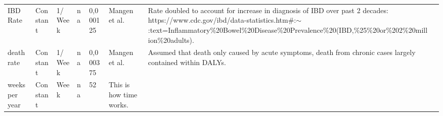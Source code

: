 \begin{landscape}
\begin{longtable}[c]{m{10em}lllm{15em}lll}
IBD Rate                                      & Constant & 1/Week                   & na                        & 0,000125                                                                                                                                                                                                                                                                                 & Mangen et al.                                                                                                                                                                                & Rate doubled to account for increase in diagnosis of IBD over past 2 decades: https://www.cdc.gov/ibd/data-statistics.htm\#:$\sim$:text=Inflammatory\%20Bowel\%20Disease\%20Prevalence\%20(IBD,\%25\%20or\%202\%20million\%20adults). \\
death rate                                    & Constant & 1/Week                   & na                        & 0,000375                                                                                                                                                                                                                                                                                 & Mangen et al.                                                                                                                                                                                & Assumed that death only caused by acute symptoms, death from chronic cases largely contained within DALYs.                                                                                                                            \\
weeks per year                                & Constant & Week                     & na                        & 52                                                                                                                                                                                                                                                                                       & This is how time works.                                                                                                                                                                      &                                                                                                                                                                                                                                       \\

\end{longtable}
\end{landscape}
